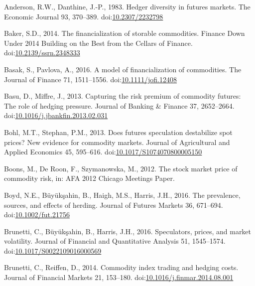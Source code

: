 \documentclass[]{elsarticle} %
\begin{document}
\leavevmode\hypertarget{ref-anderson_hedger_1983}{}%
Anderson, R.W., Danthine, J.-P., 1983. Hedger diversity in futures
markets. The Economic Journal 93, 370--389.
doi:\href{https://doi.org/10.2307/2232798}{10.2307/2232798}

\leavevmode\hypertarget{ref-baker_financialization_2014}{}%
Baker, S.D., 2014. The financialization of storable commodities. Finance
Down Under 2014 Building on the Best from the Cellars of Finance.
doi:\href{https://doi.org/10.2139/ssrn.2348333\%20}{10.2139/ssrn.2348333 }

\leavevmode\hypertarget{ref-basak_model_2016}{}%
Basak, S., Pavlova, A., 2016. A model of financialization of
commodities. The Journal of Finance 71, 1511--1556.
doi:\href{https://doi.org/10.1111/jofi.12408}{10.1111/jofi.12408}

\leavevmode\hypertarget{ref-basu_capturing_2013}{}%
Basu, D., Miffre, J., 2013. Capturing the risk premium of commodity
futures: The role of hedging pressure. Journal of Banking \& Finance 37,
2652--2664.
doi:\href{https://doi.org/10.1016/j.jbankfin.2013.02.031}{10.1016/j.jbankfin.2013.02.031}

\leavevmode\hypertarget{ref-bohl_does_2013}{}%
Bohl, M.T., Stephan, P.M., 2013. Does futures speculation destabilize
spot prices? New evidence for commodity markets. Journal of Agricultural
and Applied Economics 45, 595--616.
doi:\href{https://doi.org/10.1017/S1074070800005150}{10.1017/S1074070800005150}

\leavevmode\hypertarget{ref-boons_stock_2012}{}%
Boons, M., De Roon, F., Szymanowska, M., 2012. The stock market price of
commodity risk, in: AFA 2012 Chicago Meetings Paper.

\leavevmode\hypertarget{ref-boyd_prevalence_2016}{}%
Boyd, N.E., Büyükşahin, B., Haigh, M.S., Harris, J.H., 2016. The
prevalence, sources, and effects of herding. Journal of Futures Markets
36, 671--694.
doi:\href{https://doi.org/10.1002/fut.21756}{10.1002/fut.21756}

\leavevmode\hypertarget{ref-brunetti_speculators_2016}{}%
Brunetti, C., Büyükşahin, B., Harris, J.H., 2016. Speculators, prices,
and market volatility. Journal of Financial and Quantitative Analysis
51, 1545--1574.
doi:\href{https://doi.org/10.1017/S0022109016000569}{10.1017/S0022109016000569}

\leavevmode\hypertarget{ref-brunetti_commodity_2014}{}%
Brunetti, C., Reiffen, D., 2014. Commodity index trading and hedging
costs. Journal of Financial Markets 21, 153--180.
doi:\href{https://doi.org/10.1016/j.finmar.2014.08.001}{10.1016/j.finmar.2014.08.001}
\end{document}
